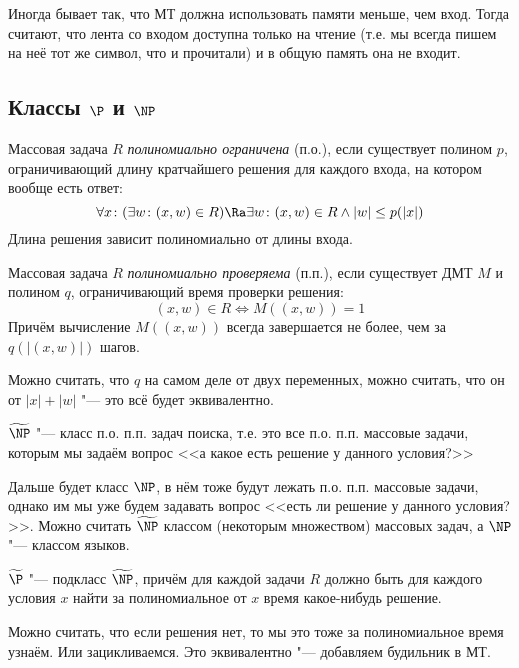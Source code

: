 	\begin{Rem}
		Иногда бывает так, что МТ должна использовать памяти меньше, чем вход.
		Тогда считают, что лента со входом доступна только на чтение (т.е. мы всегда пишем на неё тот же символ, что и прочитали)
		и в общую память она не входит.
	\end{Rem}

\subsection{Классы $\P$ и $\NP$}
	\begin{Def}
		Массовая задача $R$ \textit{полиномиально ограничена} (п.о.), если существует полином $p$, ограничивающий длину кратчайшего решения для каждого входа,
		на котором вообще есть ответ:
		\[
			\forall x \colon (\exists w \colon (x, w) \in R) \Ra \exists w \colon (x, w) \in R \land |w| \le p(|x|)
		\]
		Длина решения зависит полиномиально от длины входа.
	\end{Def}
	\begin{Def}
		Массовая задача $R$ \textit{полиномиально проверяема} (п.п.), если существует ДМТ $M$ и полином $q$, ограничивающий время проверки решения:
		\[
			(x, w) \in R \iff M((x, w))=1
		\]
		Причём вычисление $M((x, w))$ всегда завершается не более, чем за $q(|(x, w)|)$ шагов.
	\end{Def}
	\begin{Rem}
		Можно считать, что $q$ на самом деле от двух переменных, можно считать, что он от $|x|+|w|$ "--- это всё будет эквивалентно.
	\end{Rem}

	\begin{Def}
		$\widetilde{\NP}$ "--- класс п.о. п.п. задач поиска, т.е. это все п.о. п.п. массовые задачи, которым мы задаём вопрос <<а какое есть решение у данного условия?>>
	\end{Def}
	\begin{Rem}
		Дальше будет класс $\NP$, в нём тоже будут лежать п.о. п.п. массовые задачи, однако им мы уже будем задавать вопрос <<есть ли решение у данного условия?>>.
		Можно считать $\widetilde{\NP}$ классом (некоторым множеством) массовых задач, а $\NP$ "--- классом языков.
	\end{Rem}

	\begin{Def}
		$\widetilde{\P}$ "--- подкласс $\widetilde{\NP}$, причём для каждой задачи $R$ должно быть для каждого условия $x$ найти за полиномиальное от $x$ время какое-нибудь решение.
	\end{Def}
	\begin{Rem}
		Можно считать, что если решения нет, то мы это тоже за полиномиальное время узнаём.
		Или зацикливаемся.
		Это эквивалентно "--- добавляем будильник в МТ.
	\end{Rem}

